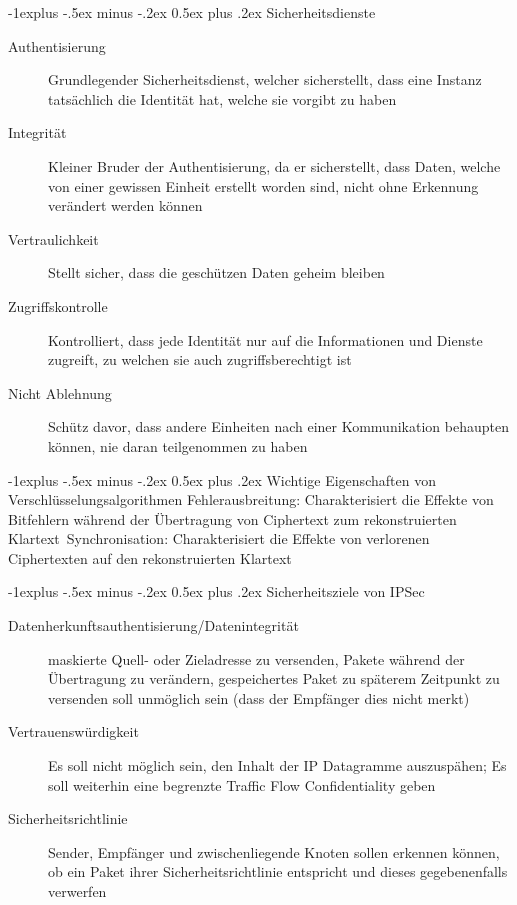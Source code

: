 \documentclass[10pt,landscape]{article}
\makeatletter
\renewcommand{\subsection}{\@startsection{subsection}{2}{0mm}%
                                {-1explus -.5ex minus -.2ex}%
                                {0.5ex plus .2ex}%
                                {\normalfont\normalsize\bfseries}}
\makeatother
\begin{document}
\begin{multicols}{3}
\subsection{Sicherheitsdienste}
\begin{description}
    \item[Authentisierung] Grundlegender Sicherheitsdienst, welcher sicherstellt, dass eine Instanz tatsächlich die Identität hat, welche sie vorgibt zu haben
    \item[Integrität] Kleiner Bruder der Authentisierung, da er sicherstellt, dass Daten, welche von einer gewissen Einheit erstellt worden sind, nicht ohne Erkennung verändert werden können
    \item[Vertraulichkeit] Stellt sicher, dass die geschützen Daten geheim bleiben
    \item[Zugriffskontrolle] Kontrolliert, dass jede Identität nur auf die Informationen und Dienste zugreift, zu welchen sie auch zugriffsberechtigt ist
    \item[Nicht Ablehnung] Schütz davor, dass andere Einheiten nach einer Kommunikation behaupten können, nie daran teilgenommen zu haben
\end{description}

\subsection{Wichtige Eigenschaften von Verschlüsselungsalgorithmen}
Fehlerausbreitung: Charakterisiert die Effekte von Bitfehlern während der Übertragung von Ciphertext zum rekonstruierten Klartext\
Synchronisation: Charakterisiert die Effekte von verlorenen Ciphertexten auf den rekonstruierten Klartext

\subsection{Sicherheitsziele von IPSec}
\begin{description}
    \item[Datenherkunftsauthentisierung/Datenintegrität] maskierte Quell- oder Zieladresse zu versenden, Pakete während der Übertragung zu verändern, gespeichertes Paket zu späterem Zeitpunkt zu versenden soll unmöglich sein (dass der Empfänger dies nicht merkt)
    \item[Vertrauenswürdigkeit] Es soll nicht möglich sein, den Inhalt der IP Datagramme auszuspähen; Es soll weiterhin eine begrenzte Traffic Flow Confidentiality geben
    \item[Sicherheitsrichtlinie] Sender, Empfänger und zwischenliegende Knoten sollen erkennen können, ob ein Paket ihrer Sicherheitsrichtlinie entspricht und dieses gegebenenfalls verwerfen
\end{description}



\end{multicols}
\end{document}
